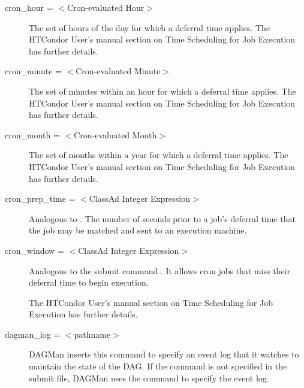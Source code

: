 \begin{description}
\label{condor-submit-cron-hour}
\item[cron\_hour = $<$Cron-evaluated Hour$>$]
The set of hours of the day for which a deferral time applies.
The HTCondor User's manual section on Time Scheduling for Job Execution
has further details.

\label{condor-submit-cron-minute}
\item[cron\_minute = $<$Cron-evaluated Minute$>$]
The set of minutes within an hour for which a deferral time applies.
The HTCondor User's manual section on Time Scheduling for Job Execution
has further details.

\label{condor-submit-cron-month}
\item[cron\_month = $<$Cron-evaluated Month$>$]
The set of months within a year for which a deferral time applies.
The HTCondor User's manual section on Time Scheduling for Job Execution
has further details.

\label{condor-submit-cron-prep-time}
\item[cron\_prep\_time = $<$ClassAd Integer Expression$>$]
Analogous to .
The number of seconds prior to a job's deferral time that
the job may be matched and sent to an execution machine.


\label{condor-submit-cron-window}
\item[cron\_window = $<$ClassAd Integer Expression$>$]
Analogous to the submit command .
It allows cron jobs that
miss their deferral time to begin execution.

The HTCondor User's manual section on Time Scheduling for Job Execution
has further details.


\label{condor-submit-dagman-log}
\item[dagman\_log = $<$pathname$>$] 
DAGMan inserts this command to specify an event log that it watches to maintain
the state of the DAG. If the  command is not specified in the
submit file, DAGMan uses the  command to specify the event log.


\end{description}
